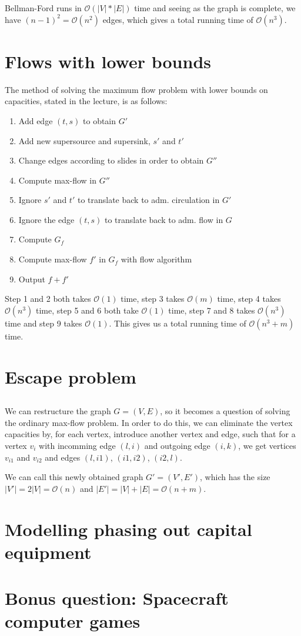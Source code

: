 \documentclass[a4paper]{article}
\begin{document}
Bellman-Ford runs in $\mathcal{O}(|V|*|E|)$ time and seeing as the graph is complete, we have $(n-1)^2=\mathcal{O}(n^2)$ edges, which gives a total running time of $\mathcal{O}(n^3)$.
\section{Flows with lower bounds}
The method of solving the maximum flow problem with lower bounds on capacities, stated in the lecture, is as follows:
\begin{enumerate}
    \item Add edge $(t,s)$ to obtain $G'$
    \item Add new supersource and supersink, $s'$ and $t'$
    \item Change edges according to slides in order to obtain $G''$
    \item Compute max-flow in $G''$
    \item Ignore $s'$ and $t'$ to translate back to adm. circulation in $G'$
    \item Ignore the edge $(t,s)$ to translate back to adm. flow in $G$
    \item Compute $G_f$
    \item Compute max-flow $f'$ in $G_f$ with flow algorithm
    \item Output $f+f'$
\end{enumerate}
Step 1 and 2 both takes $\mathcal{O}(1)$ time, step 3 takes $\mathcal{O}(m)$ time, step 4 takes $\mathcal{O}(n^3)$ time, step 5 and 6 both take $\mathcal{O}(1)$ time, step 7 and 8 takes $\mathcal{O}(n^3)$ time and step 9 takes $\mathcal{O}(1)$. This gives us a total running time of $\mathcal{O}(n^3+m)$ time.
\section{Escape problem}
\subsection{}
We can restructure the graph $G=(V,E)$, so it becomes a question of solving the ordinary max-flow problem. In order to do this, we can eliminate the vertex capacities by, for each vertex, introduce another vertex and edge, such that for a vertex $v_i$ with incomming edge $(l,i)$ and outgoing edge $(i,k)$, we get vertices $v_{i1}$ and $v_{i2}$ and edges $(l,i1)$, $(i1,i2)$, $(i2,l)$.

We can call this newly obtained graph $G'=(V', E')$, which has the size $|V'|=2|V|= \mathcal{O}(n)$ and $|E'|=|V|+|E|=\mathcal{O}(n+m)$.
\subsection{}

\section{Modelling phasing out capital equipment}

\section{Bonus question: Spacecraft computer games}
\end{document}
